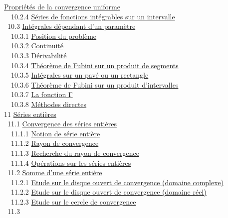 \documentclass[]{article}
\begin{document}
\href{coursse61.html\#x74-32800010.2.3}{Propriétés de la convergence
uniforme} \\ ~~10.2.4 \href{coursse61.html\#x74-32900010.2.4}{Séries de
fonctions intégrables sur un intervalle} \\ ~10.3
\href{coursse62.html\#x75-33000010.3}{Intégrales dépendant d'un
paramètre} \\ ~~10.3.1 \href{coursse62.html\#x75-33100010.3.1}{Position
du problème} \\ ~~10.3.2
\href{coursse62.html\#x75-33200010.3.2}{Continuité} \\ ~~10.3.3
\href{coursse62.html\#x75-33300010.3.3}{Dérivabilité} \\ ~~10.3.4
\href{coursse62.html\#x75-33400010.3.4}{Théorème de Fubini sur un
produit de segments} \\ ~~10.3.5
\href{coursse62.html\#x75-33500010.3.5}{Intégrales sur un pavé ou un
rectangle} \\ ~~10.3.6 \href{coursse62.html\#x75-33600010.3.6}{Théorème
de Fubini sur un produit d'intervalles} \\ ~~10.3.7
\href{coursse62.html\#x75-33700010.3.7}{La fonction Γ} \\ ~~10.3.8
\href{coursse62.html\#x75-33800010.3.8}{Méthodes directes} \\ 11
\href{coursch12.html\#x76-33900011}{Séries entières} \\ ~11.1
\href{coursse63.html\#x77-34000011.1}{Convergence des séries entières}
\\ ~~11.1.1 \href{coursse63.html\#x77-34100011.1.1}{Notion de série
entière} \\ ~~11.1.2 \href{coursse63.html\#x77-34200011.1.2}{Rayon de
convergence} \\ ~~11.1.3
\href{coursse63.html\#x77-34300011.1.3}{Recherche du rayon de
convergence} \\ ~~11.1.4
\href{coursse63.html\#x77-34400011.1.4}{Opérations sur les séries
entières} \\ ~11.2 \href{coursse64.html\#x78-34500011.2}{Somme d'une
série entière} \\ ~~11.2.1 \href{coursse64.html\#x78-34600011.2.1}{Etude
sur le disque ouvert de convergence (domaine complexe)} \\ ~~11.2.2
\href{coursse64.html\#x78-34700011.2.2}{Etude sur le disque ouvert de
convergence (domaine réel)} \\ ~~11.2.3
\href{coursse64.html\#x78-34800011.2.3}{Etude sur le cercle de
convergence} \\ ~11.3
\end{document}
